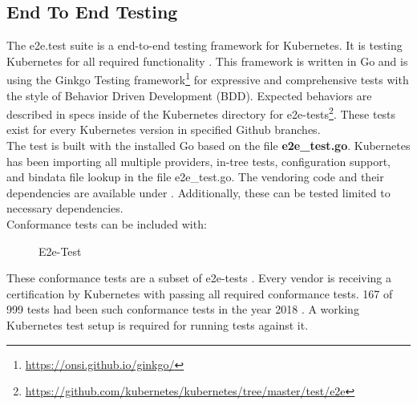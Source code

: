 \subsection{End To End Testing}
The e2e.test suite is a end-to-end testing framework for Kubernetes. It is testing Kubernetes for all required functionality \cite{Ohly2019}. This framework is written in Go and is using the Ginkgo Testing framework\footnote{\url{https://onsi.github.io/ginkgo/}} for expressive and comprehensive tests with the style of Behavior Driven Development (BDD).
Expected behaviors are described in specs inside of the Kubernetes directory for e2e-tests\footnote{\url{https://github.com/kubernetes/kubernetes/tree/master/test/e2e}}. These tests exist for every Kubernetes version in specified Github branches. \\
The test is built with the installed Go based on the file \textbf{e2e\_test.go}. Kubernetes has been importing all multiple providers, in-tree tests, configuration support, and bindata file lookup in the file e2e\_test.go.
The vendoring code and their dependencies are available under . Additionally, these can be tested limited to necessary dependencies. \\
Conformance tests can be included with: \\
\begin{figure}[H]
\centering
{}
 \caption{E2e-Test}
    \label{e2e-test}
\end{figure}

These conformance tests are a subset of e2e-tests \cite[~p.8]{Omichi2018}. Every vendor is receiving a certification by Kubernetes with passing all required conformance tests. 167 of 999 tests had been such conformance tests in the year 2018 \cite[~p.9]{Omichi2018}.
A working Kubernetes test setup is required for running tests against it.



